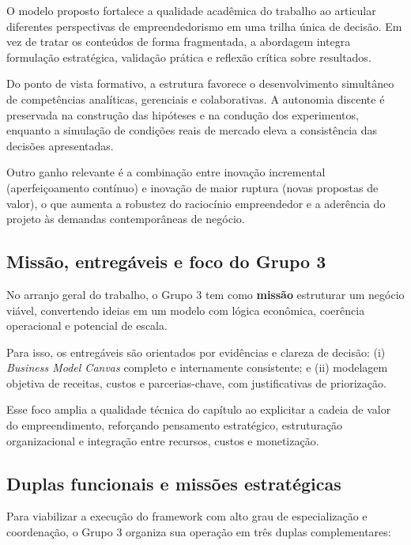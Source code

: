 O modelo proposto fortalece a qualidade acadêmica do trabalho ao articular diferentes perspectivas de empreendedorismo em uma trilha única de decisão. Em vez de tratar os conteúdos de forma fragmentada, a abordagem integra formulação estratégica, validação prática e reflexão crítica sobre resultados.

Do ponto de vista formativo, a estrutura favorece o desenvolvimento simultâneo de competências analíticas, gerenciais e colaborativas. A autonomia discente é preservada na construção das hipóteses e na condução dos experimentos, enquanto a simulação de condições reais de mercado eleva a consistência das decisões apresentadas.

Outro ganho relevante é a combinação entre inovação incremental (aperfeiçoamento contínuo) e inovação de maior ruptura (novas propostas de valor), o que aumenta a robustez do raciocínio empreendedor e a aderência do projeto às demandas contemporâneas de negócio.

\subsection{Missão, entregáveis e foco do Grupo 3}

No arranjo geral do trabalho, o Grupo 3 tem como \textbf{missão} estruturar um negócio viável, convertendo ideias em um modelo com lógica econômica, coerência operacional e potencial de escala.

Para isso, os entregáveis são orientados por evidências e clareza de decisão: (i) \textit{Business Model Canvas} completo e internamente consistente; e (ii) modelagem objetiva de receitas, custos e parcerias-chave, com justificativas de priorização.

Esse foco amplia a qualidade técnica do capítulo ao explicitar a cadeia de valor do empreendimento, reforçando pensamento estratégico, estruturação organizacional e integração entre recursos, custos e monetização.

\subsection{Duplas funcionais e missões estratégicas}

Para viabilizar a execução do framework com alto grau de especialização e coordenação, o Grupo 3 organiza sua operação em três duplas complementares:

